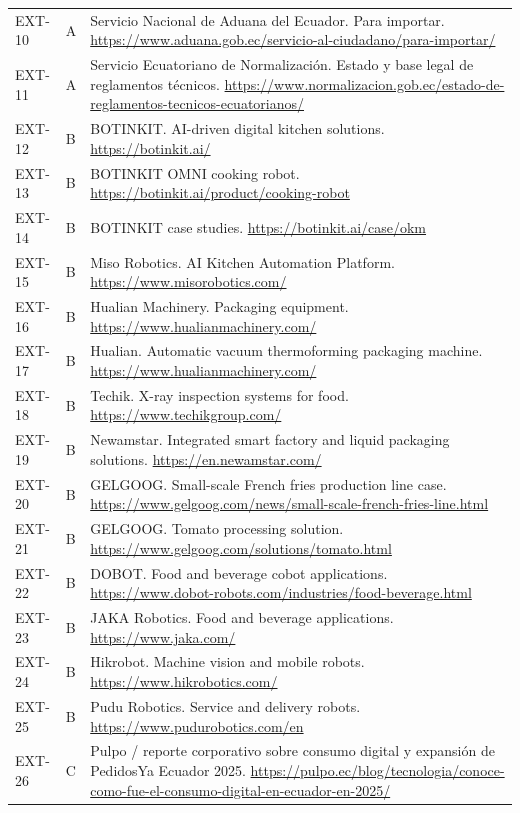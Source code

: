 \documentclass[11pt,a4paper]{article}
\begin{document}
{\begin{xltabular}{\textwidth}{@{}P{1.4cm}P{1cm}L@{}}
EXT-10 & A & Servicio Nacional de Aduana del Ecuador. Para importar. \url{https://www.aduana.gob.ec/servicio-al-ciudadano/para-importar/}\\
EXT-11 & A & Servicio Ecuatoriano de Normalización. Estado y base legal de reglamentos técnicos. \url{https://www.normalizacion.gob.ec/estado-de-reglamentos-tecnicos-ecuatorianos/}\\
EXT-12 & B & BOTINKIT. AI-driven digital kitchen solutions. \url{https://botinkit.ai/}\\
EXT-13 & B & BOTINKIT OMNI cooking robot. \url{https://botinkit.ai/product/cooking-robot}\\
EXT-14 & B & BOTINKIT case studies. \url{https://botinkit.ai/case/okm}\\
EXT-15 & B & Miso Robotics. AI Kitchen Automation Platform. \url{https://www.misorobotics.com/}\\
EXT-16 & B & Hualian Machinery. Packaging equipment. \url{https://www.hualianmachinery.com/}\\
EXT-17 & B & Hualian. Automatic vacuum thermoforming packaging machine. \url{https://www.hualianmachinery.com/}\\
EXT-18 & B & Techik. X-ray inspection systems for food. \url{https://www.techikgroup.com/}\\
EXT-19 & B & Newamstar. Integrated smart factory and liquid packaging solutions. \url{https://en.newamstar.com/}\\
EXT-20 & B & GELGOOG. Small-scale French fries production line case. \url{https://www.gelgoog.com/news/small-scale-french-fries-line.html}\\
EXT-21 & B & GELGOOG. Tomato processing solution. \url{https://www.gelgoog.com/solutions/tomato.html}\\
EXT-22 & B & DOBOT. Food and beverage cobot applications. \url{https://www.dobot-robots.com/industries/food-beverage.html}\\
EXT-23 & B & JAKA Robotics. Food and beverage applications. \url{https://www.jaka.com/}\\
EXT-24 & B & Hikrobot. Machine vision and mobile robots. \url{https://www.hikrobotics.com/}\\
EXT-25 & B & Pudu Robotics. Service and delivery robots. \url{https://www.pudurobotics.com/en}\\
EXT-26 & C & Pulpo / reporte corporativo sobre consumo digital y expansión de PedidosYa Ecuador 2025. \url{https://pulpo.ec/blog/tecnologia/conoce-como-fue-el-consumo-digital-en-ecuador-en-2025/}\\

\end{xltabular}}
\end{document}
